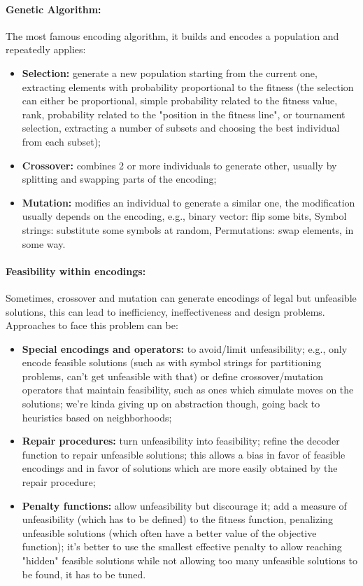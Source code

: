 \documentclass{article}
\begin{document}
	\paragraph{Genetic Algorithm:} The most famous encoding algorithm, it builds and encodes a population and repeatedly applies: 
	\begin{itemize}
		\item \textbf{Selection:} generate a new population starting from the current one, extracting elements with probability proportional to the fitness (the selection can either be proportional, simple probability related to the fitness value, rank, probability related to the "position in the fitness line", or tournament selection, extracting a number of subsets and choosing the best individual from each subset);
		\item \textbf{Crossover:} combines 2 or more individuals to generate other, usually by splitting and swapping parts of the encoding;
		\item \textbf{Mutation:} modifies an individual to generate a similar one, the modification usually depends on the encoding, e.g., binary vector: flip some bits, Symbol strings: substitute some symbols at random, Permutations: swap elements, in some way. \\
	\end{itemize}
	
	\paragraph{Feasibility within encodings:} Sometimes, crossover and mutation can generate encodings of legal but unfeasible solutions, this can lead to inefficiency, ineffectiveness and design problems. Approaches to face this problem can be: 
	\begin{itemize}
		\item \textbf{Special encodings and operators:} to avoid/limit unfeasibility; e.g., only encode feasible solutions (such as with symbol strings for partitioning problems, can't get unfeasible with that) or define crossover/mutation operators that maintain feasibility, such as ones which simulate moves on the solutions; we're kinda giving up on abstraction though, going back to heuristics based on neighborhoods;
		\item \textbf{Repair procedures:} turn unfeasibility into feasibility; refine the decoder function to repair unfeasible solutions; this allows a bias in favor of feasible encodings and in favor of solutions which are more easily obtained by the repair procedure;
		\item \textbf{Penalty functions:} allow unfeasibility but discourage it; add a measure of unfeasibility (which has to be defined) to the fitness function, penalizing unfeasible solutions (which often have a better value of the objective function); it's better to use the smallest effective penalty to allow reaching "hidden" feasible solutions while not allowing too many unfeasible solutions to be found, it has to be tuned.\\
	\end{itemize}
	
\end{document}
